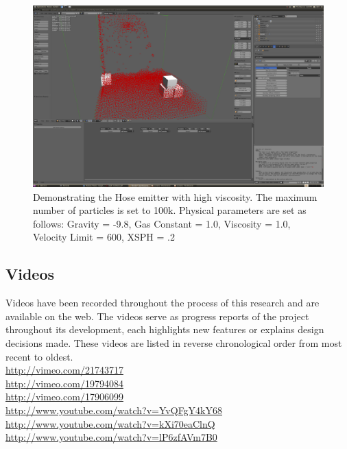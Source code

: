 \begin{figure}[!htc]
		\includegraphics[scale=0.4]{figures/viscous.png}
        \caption{ Demonstrating the Hose emitter with high viscosity. The maximum number of particles is set to 100k.
        Physical parameters are set as follows: Gravity = -9.8, Gas
        Constant = 1.0, Viscosity = 1.0, Velocity Limit = 600, XSPH = .2}
		\label{fig:viscous}
\end{figure}

\pagebreak
\clearpage



\subsection{Videos}

Videos have been recorded throughout the process of this research and are
available on the web. The videos serve as progress reports of the project
throughout its development, each highlights new features or explains
design decisions made. These videos are listed in reverse chronological order
from most recent to oldest. \\
\url{http://vimeo.com/21743717} \\
\url{http://vimeo.com/19794084} \\
\url{http://vimeo.com/17906099} \\
\url{http://www.youtube.com/watch?v=YvQFgY4kY68} \\
\url{http://www.youtube.com/watch?v=kXi70eaClnQ} \\
\url{http://www.youtube.com/watch?v=lP6zfAVm7B0} \\



